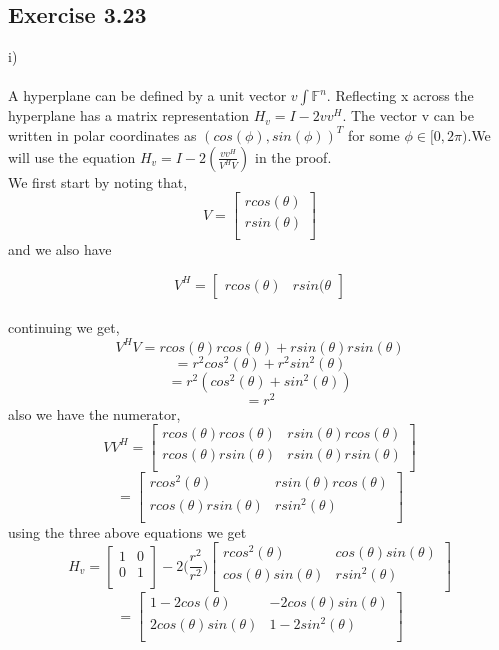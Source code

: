 \documentclass[letterpaper,12pt]{article}
\theoremstyle{definition}
\begin{document}
\subsection*{Exercise 3.23}
i) \\ \\
A hyperplane can be defined by a unit vector $v\int \mathbb{F}^n$. Reflecting x across the hyperplane has a matrix representation $H_v = I - 2vv^H$.  The vector v can be written in polar coordinates as $(cos(\phi), sin(\phi))^T$ for some $\phi \in [0,2\pi)$.We will use the equation $H_v = I-2(\frac {vv^H}{V^H V})$ in the proof.\\ 
We first start by noting that,   
  \[V= \begin{bmatrix}
    rcos(\theta) \\
    rsin(\theta) \\
    \end{bmatrix}\]
and we also have

    \[V^H= \begin{bmatrix}
    rcos(\theta) & rsin(\theta
    \end{bmatrix}\]\\
continuing we get,
 \[V^H V = rcos(\theta)rcos(\theta)+rsin(\theta)rsin(\theta)\]
 \[=r^2 cos^2(\theta)+ r^2 sin^2(\theta)\]
 \[=r^2(cos^2(\theta)+sin^2(\theta))\]
 \[=r^2\]
also we have the numerator,
\[VV^H= \begin{bmatrix}
    rcos(\theta)rcos(\theta) & rsin(\theta)rcos(\theta) \\
    rcos(\theta)rsin(\theta) & rsin(\theta)rsin(\theta) \\
    \end{bmatrix}\]
\[=
\begin{bmatrix}
    rcos^2(\theta) & rsin(\theta)rcos(\theta) \\
    rcos(\theta)rsin(\theta) & rsin^2(\theta) \\
 \end{bmatrix}
 \]
 using the three above equations we get
 \[H_v=
 \begin{bmatrix}
    1 & 0 \\
    0 & 1 \\
 \end{bmatrix}
-2\big(\frac{r^2}{r^2}\big )\begin{bmatrix}
    rcos^2(\theta) & cos(\theta)sin(\theta) \\
    cos(\theta)sin(\theta) & rsin^2(\theta)\\
 \end{bmatrix}
 \]
\[=
\begin{bmatrix}
    1-2cos(\theta) & -2cos(\theta)sin(\theta) \\
   2cos(\theta)sin(\theta) & 1-2sin^2(\theta) \\
 \end{bmatrix}\]
\end{document}
